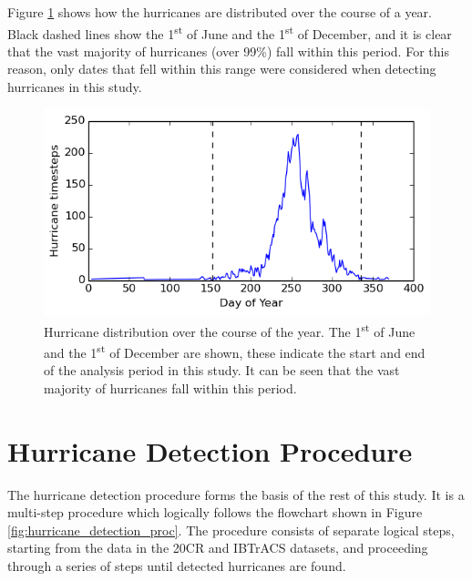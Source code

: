 \documentclass[pdftex,12pt,a4paper]{report}
\newcommand{\ts}{\textsuperscript}
\begin{document}
\newpage
Figure \ref{fig:yearly_hurr_dist} shows how the hurricanes are distributed over the course of a
year. Black dashed lines show the 1\ts{st} of June and the 1\ts{st} of December, and it is clear
that the vast majority of hurricanes (over 99\%) fall within this period. For this reason, only
dates that fell within this range were considered when detecting hurricanes in this study.

\begin{figure}[hb!]
    \centering
    \includegraphics[width=\textwidth]{figures/yearly_hurr_dist}
    \caption{Hurricane distribution over the course of the year. The 1\ts{st} of June and the
    1\ts{st} of December are shown, these indicate the start and end of the analysis period in this
study. It can be seen that the vast majority of hurricanes fall within this period.}
    \label{fig:yearly_hurr_dist}
\end{figure}


\chapter{Hurricane Detection Procedure}
\label{chap:hurricane_detection_proc}


The hurricane detection procedure forms the basis of the rest of this study. It is a multi-step
procedure which logically follows the flowchart shown in Figure \ref{fig:hurricane_detection_proc}.
The procedure consists of separate logical steps, starting from the data in the 20CR and IBTrACS
datasets, and proceeding through a series of steps until detected hurricanes are found. 
\end{document}
